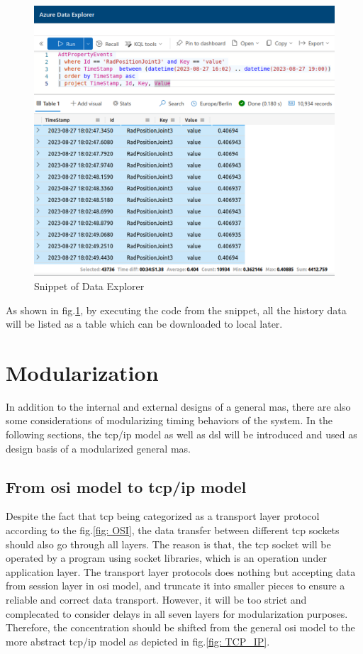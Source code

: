\begin{figure}[htb]
    \includegraphics[width=\textwidth]{figures/KQL_cut.jpg}
    
    \centering
    \caption{Snippet of Data Explorer\label{fig: KQL}}
\end{figure}

As shown in fig.\ref{fig: KQL}, by executing the code from the snippet, all the history data will be listed as a table 
which can be downloaded to local later. 


\section{Modularization}\label{chap: Meth-Modular}
In addition to the internal and external designs of a general \gls{mas}, 
there are also some considerations of modularizing timing behaviors of the 
system. In the following sections, the \gls{tcp/ip} model as well as 
\gls{dsl} will be introduced and used as design basis of a modularized general 
\gls{mas}. 
\subsection{From \gls{osi} model to \gls{tcp/ip} model}

Despite the fact that \gls{tcp} being categorized as a transport layer protocol 
according to the fig.\ref{fig: OSI}, the data transfer
between different \gls{tcp} sockets should also go through all layers. 
The reason is that, the \gls{tcp} socket will be operated by a program 
using socket libraries, which is an operation under application layer. 
The transport layer protocols does nothing but accepting data from session layer 
in \gls{osi} model, and truncate it into smaller pieces to ensure a reliable and correct
data transport. However, it will be too strict and complecated 
to consider delays in all seven 
layers for modularization purposes. Therefore, the concentration should be 
shifted from the general \gls{osi} model to the more abstract \gls{tcp/ip} model 
as depicted in fig.\ref{fig: TCP_IP}. 


